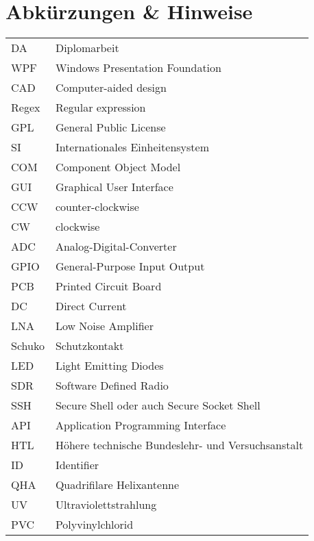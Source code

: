 \section*{Abkürzungen \& Hinweise}
\begin{singlespace}
	\begin{tabular}{ll}
		DA     & Diplomarbeit \\
		WPF    & Windows Presentation Foundation \\
		CAD    & Computer-aided design \\
		Regex  & Regular expression \\
		GPL    & General Public License  \\
		SI     & Internationales Einheitensystem \\
		COM    & Component Object Model \\
		GUI    & Graphical User Interface \\
		CCW	   & counter-clockwise \\
		CW     & clockwise \\
		ADC	   & Analog-Digital-Converter \\
		GPIO   & General-Purpose Input Output \\
		PCB	   & Printed Circuit Board \\
		DC     & Direct Current \\
		LNA    & Low Noise Amplifier \\
		Schuko & Schutzkontakt \\
		LED	   & Light Emitting Diodes \\
		SDR    & Software Defined Radio \\
		SSH    & Secure Shell oder auch Secure Socket Shell \\
		API    & Application Programming Interface \\
		HTL    & Höhere technische Bundeslehr- und Versuchsanstalt \\
		ID     & Identifier \\
		QHA    & Quadrifilare Helixantenne \\
		UV     & Ultraviolettstrahlung \\
		PVC    & Polyvinylchlorid \\
	\end{tabular}
\end{singlespace}

\pagebreak
